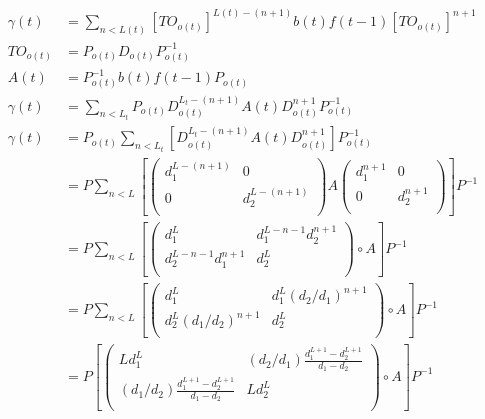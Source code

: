 \documentclass{article}
\begin{document}
  \begin{align*}
   \gamma(t) &= \sum_{n<L(t)} \left[TO_{o(t)}\right]^{L(t)-(n+1)}b(t)f(t-1)\left[TO_{o(t)}\right]^{n+1}\\
   TO_{o(t)} &= P_{o(t)}D_{o(t)}P_{o(t)}^{-1}\\
   A(t) &= P_{o(t)}^{-1}b(t)f(t-1)P_{o(t)}\\
   \gamma(t) &= \sum_{n<L_t}P_{o(t)}D_{o(t)}^{L_t-(n+1)}A(t)D_{o(t)}^{n+1}P_{o(t)}^{-1}\\
   \gamma(t) &= P_{o(t)}\sum_{n<L_t}\left[D_{o(t)}^{L_t-(n+1)}A(t)D_{o(t)}^{n+1}\right]P_{o(t)}^{-1}\\
  &= P\sum_{n<L} \left[ \begin{pmatrix} d_1^{L-(n+1)} &0\\ 0 & d_2^{L-(n+1)}\\ \end{pmatrix} A \begin{pmatrix} d_1^{n+1} &0\\ 0 & d_2^{n+1}\\ \end{pmatrix}\right]P^{-1}\\
  &= P\sum_{n<L} \left[ \begin{pmatrix} d_1^L & d_1^{L-n-1}d_2^{n+1}\\ d_2^{L-n-1}d_1^{n+1} & d_2^L\\ \end{pmatrix} \circ A \right]P^{-1}\\
  &= P\sum_{n<L} \left[ \begin{pmatrix} d_1^L & d_1^L(d_2/d_1)^{n+1}\\ d_2^L(d_1/d_2)^{n+1} & d_2^L\\ \end{pmatrix} \circ A \right]P^{-1}\\
  &= P\left[ \begin{pmatrix} Ld_1^L & (d_2/d_1)\frac{d_1^{L+1}-d_2^{L+1}}{d_1-d_2}\\ (d_1/d_2)\frac{d_1^{L+1}
         -d_2^{L+1}}{d_1-d_2} & L d_2^L\\ \end{pmatrix} \circ A \right]P^{-1}\\ 
  \end{align*}
\end{document}
